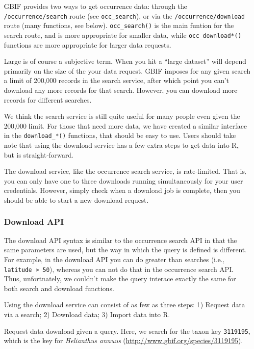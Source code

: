 \documentclass[author-year, review, 11pt]{components/elsarticle} %
\begin{document}
GBIF provides two ways to get occurrence data: through the
\texttt{/occurrence/search} route (see \texttt{occ\_search}), or via the
\texttt{/occurrence/download} route (many functions, see below).
\texttt{occ\_search()} is the main funtion for the search route, and is
more appropriate for smaller data, while \texttt{occ\_download*()}
functions are more appropriate for larger data requests.

Large is of course a subjective term. When you hit a ``large dataset''
will depend primarily on the size of the your data request. GBIF imposes
for any given search a limit of 200,000 records in the search service,
after which point you can't download any more records for that search.
However, you can download more records for different searches.

We think the search service is still quite useful for many people even
given the 200,000 limit. For those that need more data, we have created
a similar interface in the \texttt{download\_*()} functions, that should
be easy to use. Users should take note that using the download service
has a few extra steps to get data into R, but is straight-forward.

The download service, like the occurrence search service, is
rate-limited. That is, you can only have one to three downloads running
simultaneously for your user credentials. However, simply check when a
download job is complete, then you should be able to start a new
download request.

\subsubsection{Download API}\label{download-api}

The download API syntax is similar to the occurrence search API in that
the same parameters are used, but the way in which the query is defined
is different. For example, in the download API you can do greater than
searches (i.e., \texttt{latitude \textgreater{} 50}), whereas you can
not do that in the occurrence search API. Thus, unfortnately, we
couldn't make the query interace exactly the same for both search and
download functions.

Using the download service can consist of as few as three steps: 1)
Request data via a search; 2) Download data; 3) Import data into R.

Request data download given a query. Here, we search for the taxon key
\texttt{3119195}, which is the key for \emph{Helianthus annuus}
(\url{http://www.gbif.org/species/3119195}).
\end{document}
